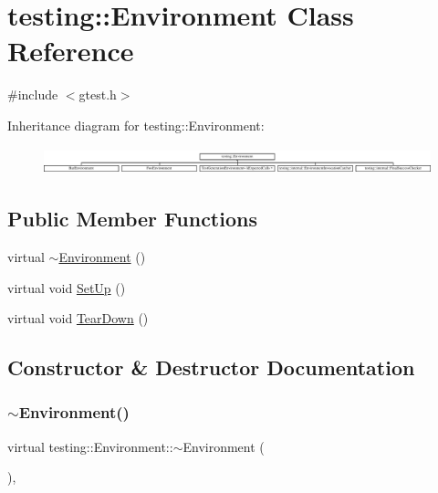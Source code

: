 \hypertarget{classtesting_1_1Environment}{}\section{testing\+::Environment Class Reference}
\label{classtesting_1_1Environment}


{\ttfamily \#include $<$gtest.\+h$>$}

Inheritance diagram for testing\+::Environment\+:\begin{figure}[H]
\begin{center}
\leavevmode
\includegraphics[height=0.785965cm]{classtesting_1_1Environment}
\end{center}
\end{figure}
\subsection*{Public Member Functions}
\begin{DoxyCompactItemize}
\item 
virtual \mbox{\hyperlink{classtesting_1_1Environment_a0e41c320362576d752cd1f44cabd57d4}{$\sim$\+Environment}} ()
\item 
virtual void \mbox{\hyperlink{classtesting_1_1Environment_a1bf8cafaa9d4eba9feb98655ee434eb3}{Set\+Up}} ()
\item 
virtual void \mbox{\hyperlink{classtesting_1_1Environment_a039bdaa705c46b9b88234cf4d3bb6254}{Tear\+Down}} ()
\end{DoxyCompactItemize}


\subsection{Constructor \& Destructor Documentation}
\mbox{\label{classtesting_1_1Environment_a0e41c320362576d752cd1f44cabd57d4}} 
\subsubsection{\texorpdfstring{$\sim$Environment()}{~Environment()}}
{\footnotesize\ttfamily virtual testing\+::\+Environment\+::$\sim$\+Environment (\begin{DoxyParamCaption}{ }\end{DoxyParamCaption})\hspace{0.3cm}{\ttfamily [inline]}, {\ttfamily [virtual]}}



